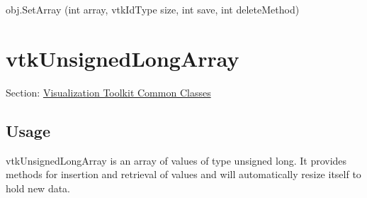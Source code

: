 \begin{DoxyItemize}
\item {\ttfamily obj.\-Set\-Array (int array, vtk\-Id\-Type size, int save, int delete\-Method)}  
\end{DoxyItemize}\hypertarget{vtkcommon_vtkunsignedlongarray}{}\section{vtk\-Unsigned\-Long\-Array}\label{vtkcommon_vtkunsignedlongarray}
Section\-: \hyperlink{sec_vtkcommon}{Visualization Toolkit Common Classes} \hypertarget{vtkwidgets_vtkxyplotwidget_Usage}{}\subsection{Usage}\label{vtkwidgets_vtkxyplotwidget_Usage}
vtk\-Unsigned\-Long\-Array is an array of values of type unsigned long. It provides methods for insertion and retrieval of values and will automatically resize itself to hold new data.

